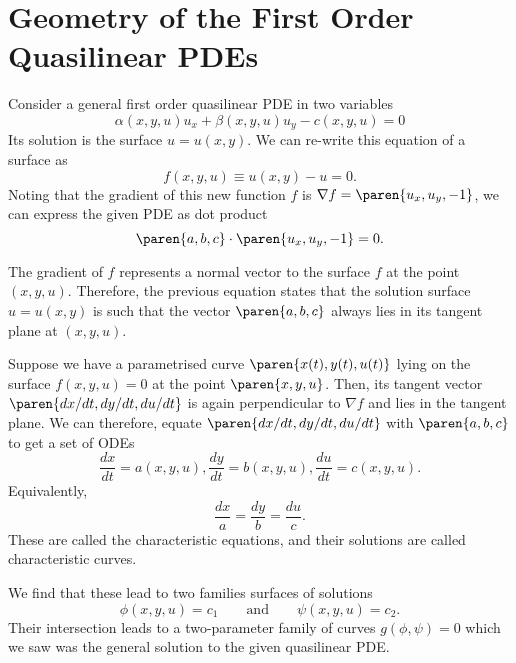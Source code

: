 \documentclass[11pt]{penrose}
\begin{document}
\section{Geometry of the First Order Quasilinear PDEs}
Consider a general first order quasilinear PDE in two variables
\begin{equation}
    \alpha(x, y, u) u_x + \beta(x, y, u) u_y - c(x, y, u) = 0
\end{equation}
Its solution is the surface $u = u(x,y)$. We can re-write this equation of a surface as
\begin{equation}
    f(x, y, u) \equiv u(x,y) - u = 0.
\end{equation}
Noting that the gradient of this new function $f$ is $\nabla f = \paren{ u_x, u_y, -1 }$, we can express the given PDE as dot product
\begin{equation}
    \paren{a, b, c} \cdot \paren{ u_x, u_y, -1 } = 0.
\end{equation}

The gradient of $f$ represents a normal vector to the surface $f$ at the point $(x, y, u)$. Therefore, the previous equation states that the solution surface $u = u(x,y)$ is such that the vector $\paren{a, b, c}$ always lies in its tangent plane at $(x, y, u)$.

Suppose we have a parametrised curve $\paren{x(t), y(t), u(t)}$ lying on the surface $f(x,y,u) = 0$ at the point $\paren{x,y,u}$. Then, its tangent vector $\paren{dx/dt, dy/dt, du/dt}$ is again perpendicular to $\nabla f$ and lies in the tangent plane. We can therefore, equate $\paren{dx/dt, dy/dt, du/dt}$ with $\paren{a, b, c}$ to get a set of ODEs
\begin{equation}
    \frac{dx}{dt} = a(x,y,u),
    \frac{dy}{dt} = b(x,y,u),
    \frac{du}{dt} = c(x,y,u).
\end{equation}
Equivalently,
\begin{equation}
    \frac{dx}{a} = \frac{dy}{b} = \frac{du}{c}.
\end{equation}
These are called the characteristic equations, and their solutions are called characteristic curves.

We find that these lead to two families surfaces of solutions
\begin{equation}
    \phi(x,y,u) = c_1
    \qquad\text{and}\qquad
    \psi(x,y,u) = c_2.
\end{equation}
Their intersection leads to a two-parameter family of curves $g(\phi, \psi) = 0$ which we saw was the general solution to the given quasilinear PDE.
\end{document}

